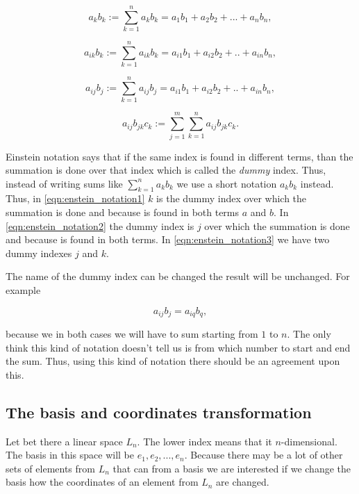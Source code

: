 \documentclass{book}
\begin{document}
\begin{equation}
\label{eqn:enstein_notation1}
a_kb_k := \sum_{k=1}^{n} a_kb_k = a_1b_1 + a_2b_2 + ... + a_nb_n,
\end{equation}

\begin{equation}
\label{eqn:enstein_notation2}
a_{ik}b_k := \sum_{k=1}^{n} a_{ik}b_k = a_{i1}b_1 + a_{i2}b_2 + .. + a_{in}b_n,
\end{equation}

\begin{equation}
\label{eqn:enstein_notation3}
a_{ij}b_j := \sum_{k=1}^{n} a_{ij}b_j = a_{i1}b_1 + a_{i2}b_2 + .. + a_{in}b_n,
\end{equation}

\begin{equation}
\label{eqn:enstein_notation4}
a_{ij}b_{jk}c_k := \sum_{j=1}^{m}\sum_{k=1}^{n} a_{ij}b_{jk}c_k.
\end{equation}

Einstein notation says that if the same index is
found in different terms, than the summation
is done over that index which is called the \emph{dummy}
index. Thus, instead of writing sums like $\sum_{k=1}^{n} a_kb_k$ we use a short notation $a_kb_k$ instead. Thus, in \eqref{eqn:enstein_notation1} $k$ is the dummy index over which the summation is done and because is found in both terms $a$ and $b$. In \eqref{eqn:enstein_notation2} the dummy index is $j$ over which the summation is done and 
because is found in both terms. In \eqref{eqn:enstein_notation3} we have two dummy indexes $j$ and $k$.

The name of the dummy index can be changed the result will be unchanged. For example

\[a_{ij}b_j = a_{iq}b_q,\]

because we in both cases we will have to sum starting from $1$ to $n$. The only think this kind of notation doesn't tell us is from which number to start and end the sum. Thus, using this kind of notation there should be an agreement upon this.

\subsection{The basis and coordinates transformation}

Let bet there a linear space $L_n$. The lower index means that it $n$-dimensional. The basis in this space will be $e_1, e_2, ..., e_n$. Because there may be a lot of other sets of elements from $L_n$ that can from a basis we are interested if we change the basis how the coordinates of an element from $L_n$ are changed.
\end{document}
